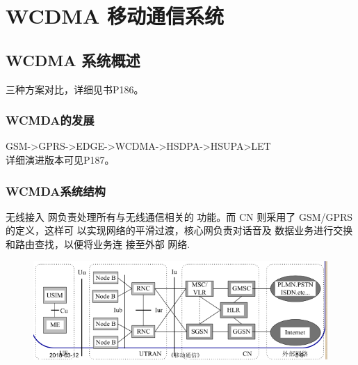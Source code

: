 \chapter{WCDMA 移动通信系统}
\section{WCDMA 系统概述}
三种方案对比，详细见书P186。
\subsection{WCMDA的发展}
GSM->GPRS->EDGE->WCDMA->HSDPA->HSUPA>LET\\
详细演进版本可见P187。
\subsection{WCMDA系统结构}
无线接入 网负责处理所有与无线通信相关的
功能。而 CN 则采用了 GSM/GPRS 的定义，这样可
以实现网络的平滑过渡，核心网负责对话音及
数据业务进行交换和路由查找，以便将业务连
接至外部 网络.
\begin{figure}[H]
	\centering
	\includegraphics[width=0.7\linewidth]{figures/screenshot011}
	\caption{}
	\label{fig:screenshot011}
\end{figure}
